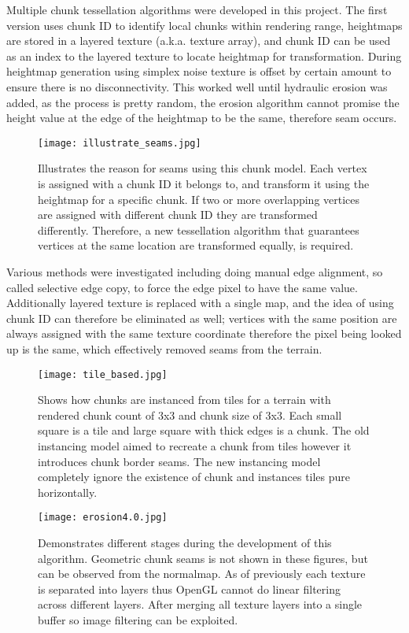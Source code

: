 \documentclass[oneside, a4paper]{article}
\begin{document}
    Multiple chunk tessellation algorithms were developed in this project. The first version uses chunk ID to identify local chunks within rendering range, heightmaps are stored in a layered texture (a.k.a. texture array), and chunk ID can be used as an index to the layered texture to locate heightmap for transformation. During heightmap generation using simplex noise texture is offset by certain amount to ensure there is no disconnectivity. This worked well until hydraulic erosion was added, as the process is pretty random, the erosion algorithm cannot promise the height value at the edge of the heightmap to be the same, therefore seam occurs.

    \begin{figure}[H]
        \texttt{[image: illustrate\_seams.jpg]}
        \caption{Illustrates the reason for seams using this chunk model. Each vertex is assigned with a chunk ID it belongs to, and transform it using the heightmap for a specific chunk. If two or more overlapping vertices are assigned with different chunk ID they are transformed differently. Therefore, a new tessellation algorithm that guarantees vertices at the same location are transformed equally, is required.}
    \end{figure}

    Various methods were investigated including doing manual edge alignment, so called selective edge copy, to force the edge pixel to have the same value. Additionally layered texture is replaced with a single map, and the idea of using chunk ID can therefore be eliminated as well; vertices with the same position are always assigned with the same texture coordinate therefore the pixel being looked up is the same, which effectively removed seams from the terrain. 

    \begin{figure}[H]
        \texttt{[image: tile\_based.jpg]}
        \caption{Shows how chunks are instanced from tiles for a terrain with rendered chunk count of 3x3 and chunk size of 3x3. Each small square is a tile and large square with thick edges is a chunk. The old instancing model aimed to recreate a chunk from tiles however it introduces chunk border seams. The new instancing model completely ignore the existence of chunk and instances tiles pure horizontally.}

        \texttt{[image: erosion4.0.jpg]}
        \caption{Demonstrates different stages during the development of this algorithm. Geometric chunk seams is not shown in these figures, but can be observed from the normalmap. As of previously each texture is separated into layers thus OpenGL cannot do linear filtering across different layers. After merging all texture layers into a single buffer so image filtering can be exploited.}
    \end{figure}
\end{document}

